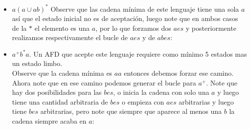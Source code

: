 \begin{itemize}[label={$\bullet$}]
    \item $a(a\cup ab)^*$ Observe que las cadena mínima de este lenguaje tiene una sola $a$ así que el estado inicial no es de aceptación, luego note que en ambos casos de la $*$ el elemento es una $a$, por lo que forzamos dos $aes$ y posteriormente realizamos respectivamente el bucle de $aes$ y de $abes$:

    \begin{basedtikz}
    \centering
    \end{basedtikz}
     
    \item $a^+b^*a.$ Un AFD  que acepte este lenguaje requiere como mínimo 5 estados mas un estado limbo.\\

    Observe que la cadena mínima es $aa$ entonces debemos forzar ese camino. Ahora note que en ese camino podemos generar el bucle para $a^+$. Note que hay dos posibilidades para las $bes$, o inicia la cadena con solo una $a$ y luego tiene una cantidad arbitraria de $bes$ o empieza con $aes$ arbitrarias y luego tiene $bes$ arbitrarias, pero note que siempre que aparece al menos una $b$ la cadena siempre acaba en $a$:
     
    \begin{basedtikz}
    \centering
    \end{basedtikz}


\end{itemize}
